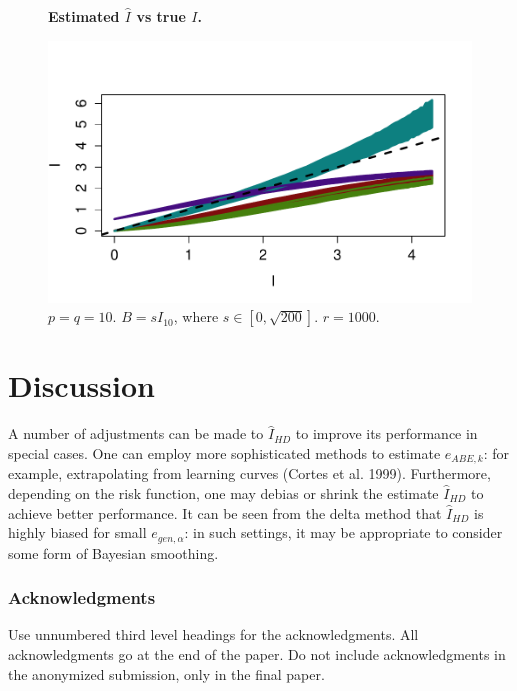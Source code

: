 \documentclass{article}
\begin{document}
\begin{figure}
\begin{center}
\textbf{Estimated $\hat{I}$ vs true $I$.} 

\includegraphics[scale = 0.5, clip=true, trim=0.4in 0.5in 0 0.5in]{../info_theory_sims/fig4.pdf}
\end{center}
\caption{$p = q = 10$. $B = sI_{10}$, where $s \in [0, \sqrt{200}]$.  $r = 1000$.}
\end{figure}

\section{Discussion}



A number of adjustments can be made to $\hat{I}_{HD}$ to improve
its performance in special cases.  One can employ more sophisticated methods to
estimate $e_{ABE, k}$: for example, extrapolating from learning curves (Cortes et al. 1999).
Furthermore, depending on the risk function, one may debias or shrink the estimate $\hat{I}_{HD}$
to achieve better performance.  It can be seen from the delta method that $\hat{I}_{HD}$ is
highly biased for small $e_{gen, \alpha}$: in such settings, it may be appropriate to consider
some form of Bayesian smoothing.


\subsubsection*{Acknowledgments}

Use unnumbered third level headings for the acknowledgments. All
acknowledgments go at the end of the paper. Do not include
acknowledgments in the anonymized submission, only in the final paper.
\end{document}
